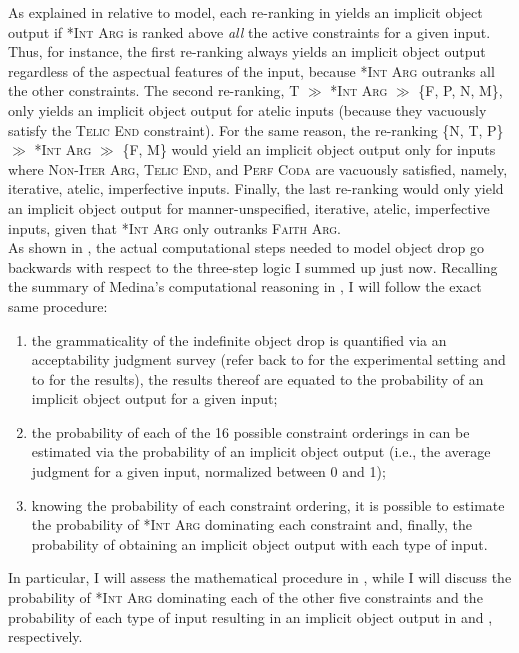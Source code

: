 As explained in  relative to  model, each re-ranking in  yields an implicit object output if \textsc{*Int Arg} is ranked above \textit{all} the active constraints for a given input. Thus, for instance, the first re-ranking always yields an implicit object output regardless of the aspectual features of the input, because \textsc{*Int Arg} outranks all the other constraints. The second re-ranking, T $\gg$ \textsc{*Int Arg} $\gg$ \{F, P, N, M\}, only yields an implicit object output for atelic inputs (because they vacuously satisfy the \textsc{Telic End} constraint). For the same reason, the re-ranking \{N, T, P\} $\gg$ \textsc{*Int Arg} $\gg$ \{F, M\} would yield an implicit object output only for inputs where \textsc{Non-Iter Arg}, \textsc{Telic End}, and \textsc{Perf Coda} are vacuously satisfied, namely, iterative, atelic, imperfective inputs. Finally, the last re-ranking would only yield an implicit object output for manner-unspecified, iterative, atelic, imperfective inputs, given that \textsc{*Int Arg} only outranks \textsc{Faith Arg}.\\
As shown in , the actual computational steps needed to model object drop go backwards with respect to the three-step logic I summed up just now. Recalling the summary of Medina's computational reasoning in , I will follow the exact same procedure:
\begin{enumerate}
    \item the grammaticality of the indefinite object drop is quantified via an acceptability judgment survey (refer back to  for the experimental setting and to  for the results), the results thereof are equated to the probability of an implicit object output for a given input;
    \item the probability of each of the 16 possible constraint orderings in  can be estimated via the probability of an implicit object output (i.e., the average judgment for a given input, normalized between 0 and 1);
    \item knowing the probability of each constraint ordering, it is possible to estimate the probability of \textsc{*Int Arg} dominating each constraint and, finally, the probability of obtaining an implicit object output with each type of input.
\end{enumerate}

In particular, I will assess the mathematical procedure in , while I will discuss the probability of \textsc{*Int Arg} dominating each of the other five constraints and the probability of each type of input resulting in an implicit object output in  and , respectively.


